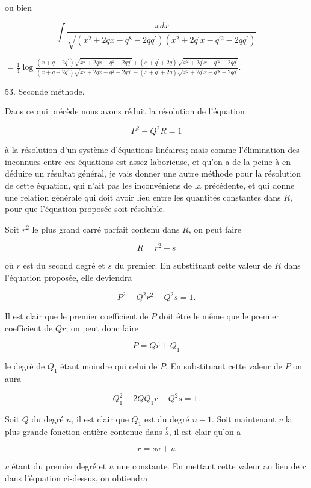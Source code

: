 \documentclass{article}
\begin{document}
ou bien

\[
\int \frac{x d x}{\sqrt{\left(x^{2}+2 q x-q^{8}-2 q q^{\prime}\right)\left(x^{2}+2 q^{\prime} x-q^{\prime 2}-2 q q^{\prime}\right)}}
\]

\(=\frac{1}{4} \log \frac{\left(x+q+2 q^{\prime}\right) \sqrt{x^{2}+2 q x-q^{2}-2 q q^{\prime}}+\left(x+q^{\prime}+2 q\right) \sqrt{x^{2}+2 q^{\prime} x-q^{\prime 2}-2 q q^{\prime}}}{\left(x+q+2 q^{\prime}\right) \sqrt{x^{2}+2 q x-q^{2}-2 q q^{\prime}}-\left(x+q^{\prime}+2 q\right) \sqrt{x^{2}+2 q^{\prime} x-q^{\prime 8}-2 q q^{\prime}}}\).

53. Seconde méthode.

Dans ce qui précède nous avons réduit la résolution de l'équation

\[
P^{2}-Q^{2} R=1
\]

à la résolution d'un système d'équations linéaires; mais comme l'élimination des inconnues entre ces équations est assez laborieuse, et qu'on a de la peine à en déduire un résultat général, je vais donner une autre méthode pour la résolution de cette équation, qui n'ait pas les inconvéniens de la précédente, et qui donne une relation générale qui doit avoir lieu entre les quantités constantes dans \(R\), pour que l'équation proposée soit résoluble.

Soit \(r^{2}\) le plus grand carré parfait contenu dans \(R\), on peut faire

\[
R=r^{2}+s
\]

où \(r\) est du second degré et \(s\) du premier. En substituant cette valeur de \(R\) dans l'équation proposée, elle deviendra

\[
P^{2}-Q^{2} r^{2}-Q^{2} s=1 .
\]

Il est clair que le premier coefficient de \(P\) doit être le même que le premier coefficient de \(Q r\); on peut donc faire

\[
P=Q r+Q_{1}
\]

le degré de \(Q_{1}\) étant moindre qui celui de \(P\). En substituant cette valeur de \(P\) on aura

\[
Q_{1}^{2}+2 Q Q_{1} r-Q^{2} s=1 .
\]

Soit \(Q\) du degré \(n\), il est clair que \(Q_{1}\) est du degré \(n-1\). Soit maintenant \(v\) la plus grande fonction entière contenue dans \(\stackrel{r}{s}\), il est clair qu'on a

\[
r=s v+u
\]

\(v\) étant du premier degré et \(u\) une constante. En mettant cette valeur au lieu de \(r\) dans l'équation ci-dessus, on obtiendra
\end{document}
